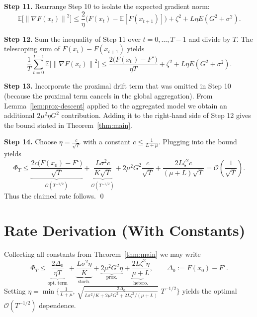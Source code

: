 \documentclass{article}
\newcommand{\E}{\mathbb{E}}
\newcommand{\norm}[1]{\left\|#1\right\|}
\begin{document}
\noindent\textbf{Step 11.} Rearrange Step 10 to isolate the expected gradient norm:
\[
\E\!\big[\norm{\nabla F(x_t)}^2\big]
\le \frac{2}{\eta}\big(F(x_t)-\E[F(x_{t+1})]\big)
+\zeta^2+L\eta E(G^2+\sigma^2).
\tag{Step 11}
\]

\noindent\textbf{Step 12.} Sum the inequality of Step 11 over $t=0,\dots,T-1$ and divide by $T$.
The telescoping sum of $F(x_t)-F(x_{t+1})$ yields
\[
\frac1T\sum_{t=0}^{T-1}\E\!\big[\norm{\nabla F(x_t)}^2\big]
\le \frac{2\big(F(x_0)-F^\star\big)}{\eta T}
+\zeta^2+L\eta E(G^2+\sigma^2).
\tag{Step 12}
\]

\noindent\textbf{Step 13.} Incorporate the proximal drift term that was omitted in Step 10
(because the proximal term cancels in the global aggregation).  
From Lemma~\ref{lem:prox-descent} applied to the aggregated model we obtain an additional
$2\mu^2\eta G^2$ contribution. Adding it to the right‑hand side of Step 12 gives the bound
stated in Theorem~\ref{thm:main}.

\noindent\textbf{Step 14.} Choose $\eta = \frac{c}{\sqrt{T}}$ with a constant $c\le \frac{1}{L+\mu}$.
Plugging into the bound yields
\[
\Phi_T\le
\underbrace{\frac{2c\big(F(x_0)-F^\star\big)}{\sqrt{T}}}_{\mathcal{O}(T^{-1/2})}
+\underbrace{\frac{L\sigma^2 c}{K\sqrt{T}}}_{\mathcal{O}(T^{-1/2})}
+2\mu^2 G^2\frac{c}{\sqrt{T}}
+\frac{2L\zeta^2 c}{(\mu+L)\sqrt{T}}
=\mathcal{O}\!\left(\frac{1}{\sqrt{T}}\right).
\]
Thus the claimed rate follows. \qed

\section*{Rate Derivation (With Constants)}
Collecting all constants from Theorem~\ref{thm:main} we may write
\[
\Phi_T \le
\underbrace{\frac{2\Delta_0}{\eta T}}_{\text{opt. term}}
+\underbrace{\frac{L\sigma^2\eta}{K}}_{\text{stoch.}}
+\underbrace{2\mu^2 G^2\eta}_{\text{prox.}}
+\underbrace{\frac{2L\zeta^2\eta}{\mu+L}}_{\text{hetero.}},
\qquad
\Delta_0:=F(x_0)-F^\star .
\]
Setting $\eta = \min\big\{\frac{1}{L+\mu},\,\sqrt{\frac{2\Delta_0}{L\sigma^2/K+2\mu^2G^2+2L\zeta^2/(\mu+L)}}\,\,T^{-1/2}\big\}$ yields the optimal $\mathcal{O}(T^{-1/2})$ dependence.
\end{document}

